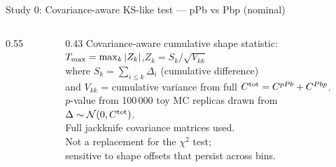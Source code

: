 \documentclass[aspectratio=169]{beamer}
\newcommand{\bno}{../output_12x12_nominal}
\begin{document}
\begin{frame}[t]{Study 0: Covariance-aware KS-like test --- pPb vs Pbp (nominal)}
  \vspace{0.3em}
  \small
  \begin{columns}[T]
    \begin{column}{0.55\textwidth}
      \resizebox{\linewidth}{!}{}
    \end{column}
    \begin{column}{0.43\textwidth}
      \small
      Covariance-aware cumulative shape statistic:\\[0.3em]
      $T_{\rm max} = \max_k |Z_k|$,\quad $Z_k = S_k / \sqrt{V_{kk}}$\\[0.2em]
      where $S_k = \sum_{i\leq k} \Delta_i$ (cumulative difference)\\
      and $V_{kk}$ = cumulative variance from full $C^{\rm tot} = C^{pPb} + C^{Pbp}$.\\[0.4em]
      $p$-value from 100\,000 toy MC replicas drawn from\\
      $\Delta \sim \mathcal{N}(0, C^{\rm tot})$.\\[0.3em]
      Full jackknife covariance matrices used.\\[0.2em]
      Not a replacement for the $\chi^2$ test;\\
      sensitive to shape offsets that persist across bins.
    \end{column}
  \end{columns}
\end{frame}
\end{document}
